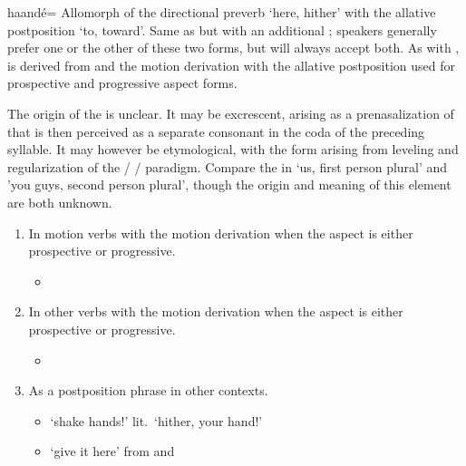 \begin{morphdesc}[resume*=alphalist]
\item[haandé=]\label{m:haandé=}
	Allomorph of the directional preverb  ‘here, hither’
		with the allative postposition  ‘to, toward’.
	Same as  but with an additional ;
		speakers generally prefer one or the other of these two forms,
		but will always accept both.
	As with ,  is derived from  and the motion derivation
		with the allative postposition used for prospective and progressive aspect forms.

	The origin of the  is unclear.
	It may be excrescent, arising as a prenasalization of  that is then perceived as
		a separate consonant in the coda of the preceding syllable.
	It may however be etymological, with the  form arising from
		leveling and regularization of the  /  /  paradigm.
	Compare the  in  ‘us, first person plural’
		and  ’you guys, second person plural’, 
		though the origin and meaning of this element are both unknown.
	\begin{enumerate}
	\item	In motion verbs with the motion derivation
			when the aspect is either prospective or progressive.
		\begin{itemize}
		\item	
		\end{itemize}
	\item	In other verbs with the motion derivation
			when the aspect is either prospective or progressive.
		\begin{itemize}
		\item	
		\end{itemize}
	\item	As a postposition phrase in other contexts.
		\begin{itemize}
		\item	{} ‘shake hands!’ lit.\ ‘hither, your hand!’
			\parencites[01/48]{leer:1973}[146.997]{nyman-leer:1993}[10]{dauenhauer-dauenhauer:2002}
		\item	{} ‘give it here’
			\parencite[01/48]{leer:1973}
			from  and 
		\end{itemize}
	\end{enumerate}


\end{morphdesc}
